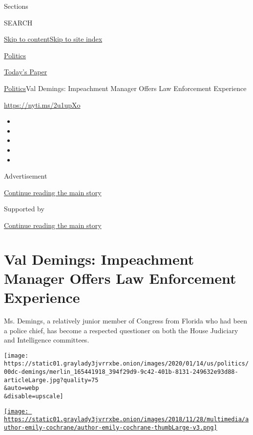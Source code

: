 Sections

SEARCH

\protect\hyperlink{site-content}{Skip to
content}\protect\hyperlink{site-index}{Skip to site index}

\href{https://www.nytimes3xbfgragh.onion/section/politics}{Politics}

\href{https://myaccount.nytimes3xbfgragh.onion/auth/login?response_type=cookie\&client_id=vi}{}

\href{https://www.nytimes3xbfgragh.onion/section/todayspaper}{Today's
Paper}

\href{/section/politics}{Politics}\textbar{}Val Demings: Impeachment
Manager Offers Law Enforcement Experience

\url{https://nyti.ms/2u1upXo}

\begin{itemize}
\item
\item
\item
\item
\item
\end{itemize}

Advertisement

\protect\hyperlink{after-top}{Continue reading the main story}

Supported by

\protect\hyperlink{after-sponsor}{Continue reading the main story}

\hypertarget{val-demings-impeachment-manager-offers-law-enforcement-experience}{%
\section{Val Demings: Impeachment Manager Offers Law Enforcement
Experience}\label{val-demings-impeachment-manager-offers-law-enforcement-experience}}

Ms. Demings, a relatively junior member of Congress from Florida who had
been a police chief, has become a respected questioner on both the House
Judiciary and Intelligence committees.

\texttt{[image: https://static01.graylady3jvrrxbe.onion/images/2020/01/14/us/politics/00dc-demings/merlin\_165441918\_394f29d9-9c42-401b-8131-249632e93d88-articleLarge.jpg?quality=75\\\&auto=webp\\\&disable=upscale]}

\href{https://www.nytimes3xbfgragh.onion/by/emily-cochrane}{\texttt{[image: https://static01.graylady3jvrrxbe.onion/images/2018/11/28/multimedia/author-emily-cochrane/author-emily-cochrane-thumbLarge-v3.png]}}

